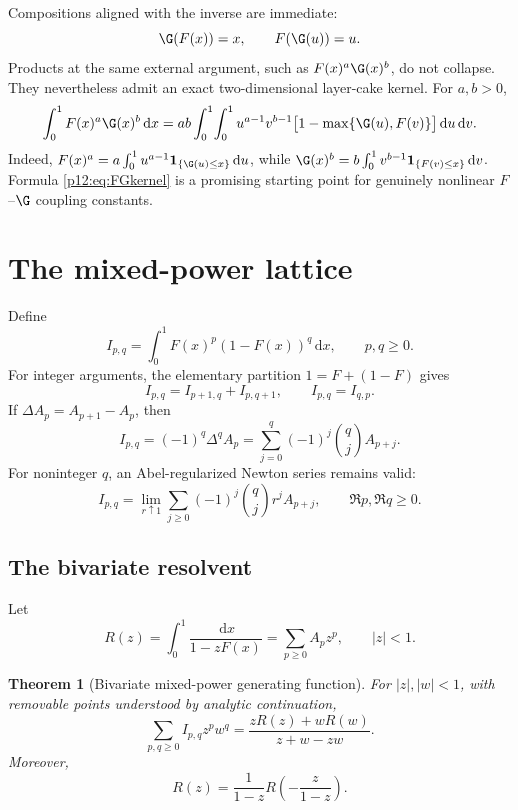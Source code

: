 \documentclass[11pt,oneside]{article}
\newtheorem{theorem}{Theorem}[section]
\theoremstyle{definition}
\theoremstyle{remark}
\newcommand{\F}{F}
\newcommand{\dd}{\,\mathrm d}
\newcommand{\1}{\mathbf 1}
\begin{document}
Compositions aligned with the inverse are immediate:
\[
 \G(\F(x))=x,
 \qquad \F(\G(u))=u.
\]
Products at the same external argument, such as \(\F(x)^a\G(x)^b\), do not
collapse.  They nevertheless admit an exact two-dimensional layer-cake kernel.
For \(a,b>0\),
\begin{equation}\label{p12:eq:FGkernel}
 \int_0^1\F(x)^a\G(x)^b\dd x
 =ab\int_0^1\!\int_0^1
 u^{a-1}v^{b-1}
 \bigl[1-\max\{\G(u),\F(v)\}\bigr]\dd u\dd v.
\end{equation}
Indeed,
\(\F(x)^a=a\int_0^1u^{a-1}\mathbf1_{\{\G(u)\le x\}}\dd u\), while
\(\G(x)^b=b\int_0^1v^{b-1}\mathbf1_{\{\F(v)\le x\}}\dd v\).  Formula
\eqref{p12:eq:FGkernel} is a promising starting point for genuinely nonlinear
\(\F\)--\(\G\) coupling constants.

\section{The mixed-power lattice}

Define
\begin{equation}\label{p12:eq:Ipq}
 I_{p,q}=\int_0^1\F(x)^p(1-\F(x))^q\dd x,
 \qquad p,q\ge0.
\end{equation}
For integer arguments, the elementary partition
\(1=\F+(1-\F)\) gives
\begin{equation}\label{p12:eq:PascalI}
 I_{p,q}=I_{p+1,q}+I_{p,q+1},
 \qquad I_{p,q}=I_{q,p}.
\end{equation}
If \(\Delta A_p=A_{p+1}-A_p\), then
\begin{equation}\label{p12:eq:finiteDI}
 I_{p,q}=(-1)^q\Delta^q A_p
 =\sum_{j=0}^q(-1)^j\binom qj A_{p+j}.
\end{equation}
For noninteger \(q\), an Abel-regularized Newton series remains valid:
\begin{equation}\label{p12:eq:abelseries}
 I_{p,q}=\lim_{r\uparrow1}
 \sum_{j\ge0}(-1)^j\binom qj r^j A_{p+j},
 \qquad \Re p,\Re q\ge0.
\end{equation}

\subsection{The bivariate resolvent}

Let
\begin{equation}\label{p12:eq:Rdef}
 R(z)=\int_0^1\frac{\dd x}{1-z\F(x)}
 =\sum_{p\ge0}A_pz^p,
 \qquad |z|<1.
\end{equation}

\begin{theorem}[Bivariate mixed-power generating function\tagnew]
For \(|z|,|w|<1\), with removable points understood by analytic continuation,
\begin{equation}\label{p12:eq:bivgen}
 \boxed{
 \sum_{p,q\ge0}I_{p,q}z^pw^q
 =\frac{zR(z)+wR(w)}{z+w-zw}.}
\end{equation}
Moreover,
\begin{equation}\label{p12:eq:Rmobius}
 R(z)=\frac1{1-z}R\!\left(-\frac z{1-z}\right).
\end{equation}
\end{theorem}
\end{document}
